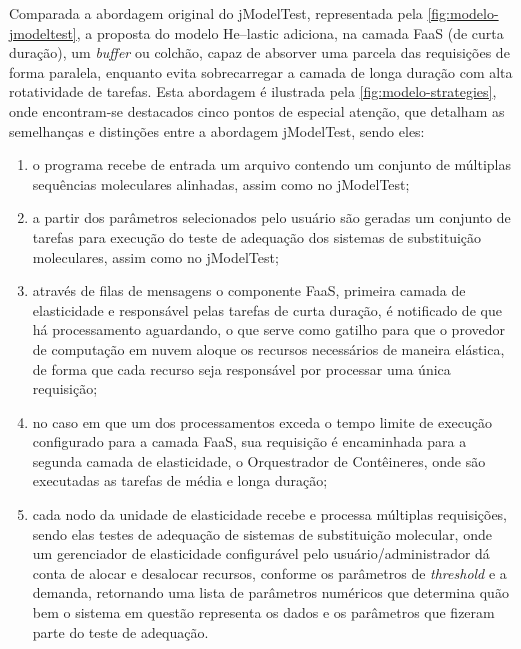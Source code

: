 \documentclass[english,brazilian]{UNISINOSmonografia} %
\begin{document}
Comparada a abordagem original do jModelTest, representada pela \autoref{fig:modelo-jmodeltest}, a proposta do modelo \textsf{He}--lastic adiciona, na camada FaaS (de curta duração), um \textit{buffer} ou colchão, capaz de absorver uma parcela das requisições de forma paralela, enquanto evita sobrecarregar a camada de longa duração com alta rotatividade de tarefas.
Esta abordagem é ilustrada pela \autoref{fig:modelo-strategies}, onde encontram-se destacados cinco pontos de especial atenção, que detalham as semelhanças e distinções entre a abordagem jModelTest, sendo eles:

\begin{enumerate}[label={\arabic*)}]

	\item o programa recebe de entrada um arquivo contendo um conjunto de múltiplas sequências moleculares alinhadas, assim como no jModelTest;
	
	\item a partir dos parâmetros selecionados pelo usuário são geradas um conjunto de tarefas para execução do teste de adequação dos sistemas de substituição moleculares, assim como no jModelTest;
	
	\item através de filas de mensagens o componente FaaS, primeira camada de elasticidade e responsável pelas tarefas de curta duração, é notificado de que há processamento aguardando, o que serve como gatilho para que o provedor de computação em nuvem aloque os recursos necessários de maneira elástica, de forma que cada recurso seja responsável por processar uma única requisição;
	
	\item no caso em que um dos processamentos exceda o tempo limite de execução configurado para a camada FaaS, sua requisição é encaminhada para a segunda camada de elasticidade, o Orquestrador de Contêineres, onde são executadas as tarefas de média e longa duração;
	
	\item cada nodo da unidade de elasticidade recebe e processa múltiplas requisições, sendo elas testes de adequação de sistemas de substituição molecular, onde um gerenciador de elasticidade configurável pelo usuário/administrador dá conta de alocar e desalocar recursos, conforme os parâmetros de \textit{threshold} e a demanda, retornando uma lista de parâmetros numéricos que determina quão bem o sistema em questão representa os dados e os parâmetros que fizeram parte do teste de adequação.

\end{enumerate}
\end{document}
